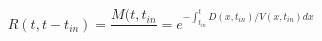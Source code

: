 \begin{equation}
R(t,t-t_{in}) = \frac{M(t,t_{in}}{} = e^{-\int_{t_{in}}^t D(x,t_{in})/V(x,t_{in}) dx}
\end{equation}
